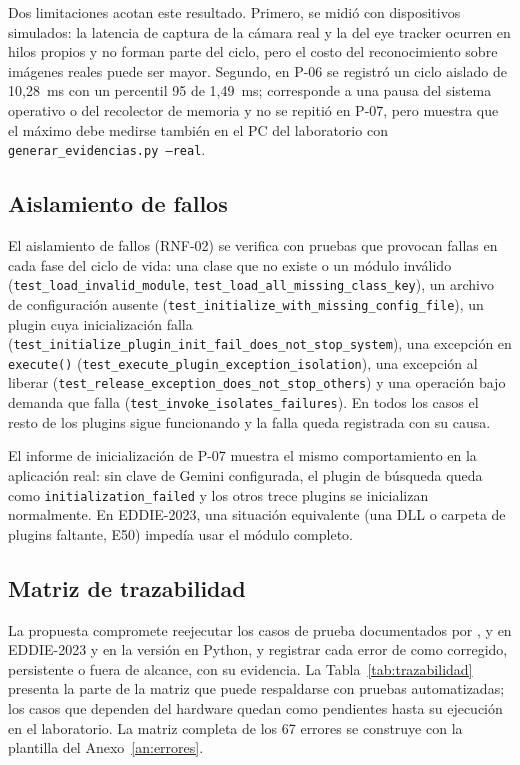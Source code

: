 Dos limitaciones acotan este resultado. Primero, se midió con dispositivos simulados: la latencia de captura de la cámara real y la del eye tracker ocurren en hilos propios y no forman parte del ciclo, pero el costo del reconocimiento sobre imágenes reales puede ser mayor. Segundo, en P-06 se registró un ciclo aislado de 10,28~ms con un percentil 95 de 1,49~ms; corresponde a una pausa del sistema operativo o del recolector de memoria y no se repitió en P-07, pero muestra que el máximo debe medirse también en el PC del laboratorio con \texttt{generar\_evidencias.py --real}.

\subsection{Aislamiento de fallos}

El aislamiento de fallos (RNF-02) se verifica con pruebas que provocan fallas en cada fase del ciclo de vida: una clase que no existe o un módulo inválido (\texttt{test\_load\_invalid\_module}, \texttt{test\_load\_all\_missing\_class\_key}), un archivo de configuración ausente (\texttt{test\_initialize\_with\_missing\_config\_file}), un plugin cuya inicialización falla (\texttt{test\_initialize\_plugin\_init\_fail\_does\_not\_stop\_system}), una excepción en \texttt{execute()} (\texttt{test\_execute\_plugin\_exception\_isolation}), una excepción al liberar (\texttt{test\_release\_exception\_does\_not\_stop\_others}) y una operación bajo demanda que falla (\texttt{test\_invoke\_isolates\_failures}). En todos los casos el resto de los plugins sigue funcionando y la falla queda registrada con su causa.

El informe de inicialización de P-07 muestra el mismo comportamiento en la aplicación real: sin clave de Gemini configurada, el plugin de búsqueda queda como \texttt{initialization\_failed} y los otros trece plugins se inicializan normalmente. En EDDIE-2023, una situación equivalente (una DLL o carpeta de plugins faltante, E50) impedía usar el módulo completo.

\subsection{Matriz de trazabilidad}
\label{sec:trazabilidad}

La propuesta compromete reejecutar los casos de prueba documentados por \citet{pezoa2020}, \citet{contreras2019} y \citet{estay2020} en EDDIE-2023 y en la versión en Python, y registrar cada error de \citet{ibaceta2023} como corregido, persistente o fuera de alcance, con su evidencia. La Tabla~\ref{tab:trazabilidad} presenta la parte de la matriz que puede respaldarse con pruebas automatizadas; los casos que dependen del hardware quedan como pendientes hasta su ejecución en el laboratorio. La matriz completa de los 67 errores se construye con la plantilla del Anexo~\ref{an:errores}.

